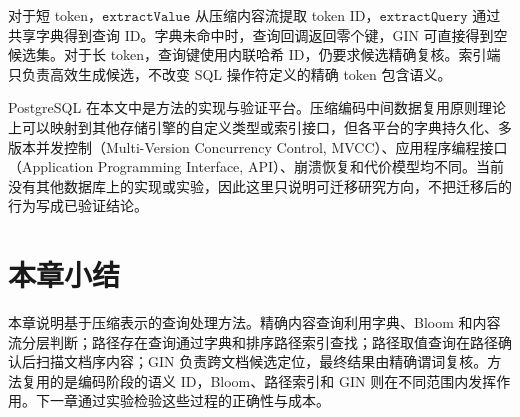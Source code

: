对于短 token，$\texttt{extractValue}$ 从压缩内容流提取 token ID，$\texttt{extractQuery}$ 通过共享字典得到查询 ID。字典未命中时，查询回调返回零个键，GIN 可直接得到空候选集。对于长 token，查询键使用内联哈希 ID，仍要求候选精确复核。索引端只负责高效生成候选，不改变 SQL 操作符定义的精确 token 包含语义。

PostgreSQL 在本文中是方法的实现与验证平台。压缩编码中间数据复用原则理论上可以映射到其他存储引擎的自定义类型或索引接口，但各平台的字典持久化、多版本并发控制（Multi-Version Concurrency Control, MVCC）、应用程序编程接口（Application Programming Interface, API）、崩溃恢复和代价模型均不同。当前没有其他数据库上的实现或实验，因此这里只说明可迁移研究方向，不把迁移后的行为写成已验证结论。

\section{本章小结}

本章说明基于压缩表示的查询处理方法。精确内容查询利用字典、Bloom 和内容流分层判断；路径存在查询通过字典和排序路径索引查找；路径取值查询在路径确认后扫描文档序内容；GIN 负责跨文档候选定位，最终结果由精确谓词复核。方法复用的是编码阶段的语义 ID，Bloom、路径索引和 GIN 则在不同范围内发挥作用。下一章通过实验检验这些过程的正确性与成本。
